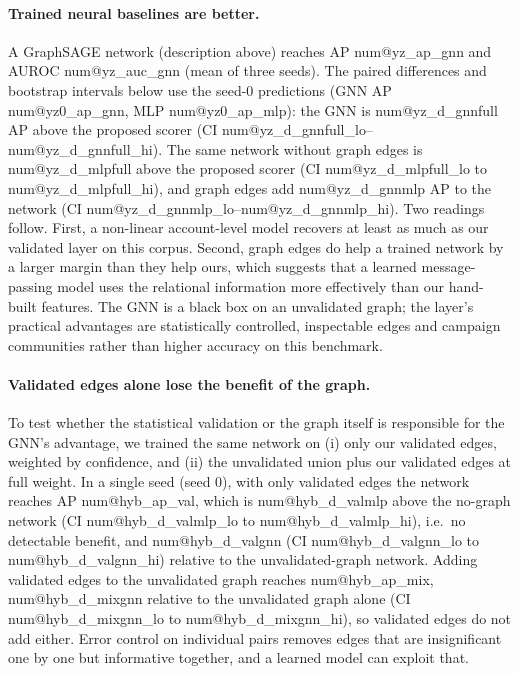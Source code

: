 \documentclass[pdflatex,sn-basic]{sn-jnl}
\makeatletter
\theoremstyle{thmstyleone}
\theoremstyle{thmstylethree}
\newcommand{\num}[1]{\csname num@#1\endcsname}
\makeatother
\begin{document}
\paragraph{Trained neural baselines are better.} A GraphSAGE network (description above) reaches AP \num{yz_ap_gnn} and AUROC \num{yz_auc_gnn} (mean of three seeds). The paired differences and bootstrap intervals below use the seed-0 predictions (GNN AP \num{yz0_ap_gnn}, MLP \num{yz0_ap_mlp}): the GNN is \num{yz_d_gnnfull} AP above the proposed scorer (CI \num{yz_d_gnnfull_lo}--\num{yz_d_gnnfull_hi}). The same network without graph edges is \num{yz_d_mlpfull} above the proposed scorer (CI \num{yz_d_mlpfull_lo} to \num{yz_d_mlpfull_hi}), and graph edges add \num{yz_d_gnnmlp} AP to the network (CI \num{yz_d_gnnmlp_lo}--\num{yz_d_gnnmlp_hi}). Two readings follow. First, a non-linear account-level model recovers at least as much as our validated layer on this corpus. Second, graph edges do help a trained network by a larger margin than they help ours, which suggests that a learned message-passing model uses the relational information more effectively than our hand-built features. The GNN is a black box on an unvalidated graph; the layer's practical advantages are statistically controlled, inspectable edges and campaign communities rather than higher accuracy on this benchmark.

\paragraph{Validated edges alone lose the benefit of the graph.} To test whether the statistical validation or the graph itself is responsible for the GNN's advantage, we trained the same network on (i) only our validated edges, weighted by confidence, and (ii) the unvalidated union plus our validated edges at full weight. In a single seed (seed 0), with only validated edges the network reaches AP \num{hyb_ap_val}, which is \num{hyb_d_valmlp} above the no-graph network (CI \num{hyb_d_valmlp_lo} to \num{hyb_d_valmlp_hi}), i.e.\ no detectable benefit, and \num{hyb_d_valgnn} (CI \num{hyb_d_valgnn_lo} to \num{hyb_d_valgnn_hi}) relative to the unvalidated-graph network. Adding validated edges to the unvalidated graph reaches \num{hyb_ap_mix}, \num{hyb_d_mixgnn} relative to the unvalidated graph alone (CI \num{hyb_d_mixgnn_lo} to \num{hyb_d_mixgnn_hi}), so validated edges do not add either. Error control on individual pairs removes edges that are insignificant one by one but informative together, and a learned model can exploit that.
\end{document}
